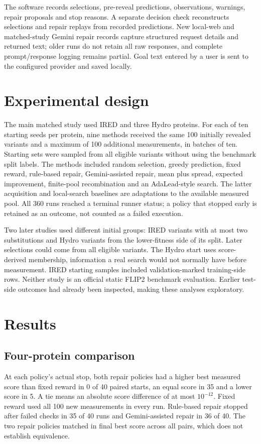 \documentclass[11pt,a4paper]{article}
\begin{document}
The software records selections, pre-reveal predictions, observations, warnings, repair proposals and stop reasons. A separate decision check reconstructs selections and repair replays from recorded predictions. New local-web and matched-study Gemini repair records capture structured request details and returned text; older runs do not retain all raw responses, and complete prompt/response logging remains partial. Goal text entered by a user is sent to the configured provider and saved locally.

\section{Experimental design}
The main matched study used IRED and three Hydro proteins. For each of ten starting seeds per protein, nine methods received the same 100 initially revealed variants and a maximum of 100 additional measurements, in batches of ten. Starting sets were sampled from all eligible variants without using the benchmark split labels. The methods included random selection, greedy prediction, fixed reward, rule-based repair, Gemini-assisted repair, mean plus spread, expected improvement, finite-pool recombination and an AdaLead-style search. The latter acquisition and local-search baselines are adaptations to the available measured pool. All 360 runs reached a terminal runner status; a policy that stopped early is retained as an outcome, not counted as a failed execution.

Two later studies used different initial groups: IRED variants with at most two substitutions and Hydro variants from the lower-fitness side of its split. Later selections could come from all eligible variants. The Hydro start uses score-derived membership, information a real search would not normally have before measurement. IRED starting samples included validation-marked training-side rows. Neither study is an official static FLIP2 benchmark evaluation. Earlier test-side outcomes had already been inspected, making these analyses exploratory.

\section{Results}
\subsection{Four-protein comparison}
At each policy's actual stop, both repair policies had a higher best measured score than fixed reward in 0 of 40 paired starts, an equal score in 35 and a lower score in 5. A tie means an absolute score difference of at most $10^{-12}$. Fixed reward used all 100 new measurements in every run. Rule-based repair stopped after failed checks in 35 of 40 runs and Gemini-assisted repair in 36 of 40. The two repair policies matched in final best score across all pairs, which does not establish equivalence.
\end{document}
